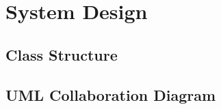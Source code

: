 \documentclass[a4paper,10pt]{article}
\begin{document}

\section{System Design}

\subsection {Class Structure}


\subsection {UML Collaboration Diagram}
\end{document}
